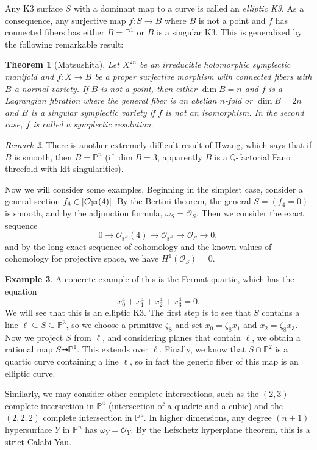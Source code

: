 \documentclass[leqno, openany]{memoir}
\newtheorem{thm}{Theorem}[section]
\theoremstyle{definition}
\newtheorem{exm}[thm]{Example}
\theoremstyle{remark}
\newtheorem{rmk}[thm]{Remark}
\theoremstyle{plain}
\theoremstyle{definition}
\theoremstyle{remark}
\newcommand{\Q}{\mathbb{Q}}
\renewcommand{\P}{\mathbb{P}}
\newcommand{\mc}[1]{\mathcal{#1}}
\begin{document}
Any K3 surface $S$ with a dominant map to a curve is called an \textit{elliptic K3}. As a consequence, any surjective map $f \colon S \to B$ where $B$ is not a point and $f$ has connected fibers has either $B = \P^1$ or $B$ is a singular K3. This is generalized by the following remarkable result:

\begin{thm}[Matsushita]
    Let $X^{2n}$ be an irreducible holomorphic symplectic manifold and $f \colon X \to B$ be a proper surjective morphism with connected fibers with $B$ a normal variety. If $B$ is not a point, then either $\dim B = n$ and $f$ is a Lagrangian fibration where the general fiber is an abelian $n$-fold or $\dim B = 2n$ and $B$ is a singular symplectic variety if $f$ is not an isomorphism. In the second case, $f$ is called a symplectic resolution.
\end{thm}

\begin{rmk}
    There is another extremely difficult result of Hwang, which says that if $B$ is smooth, then $B = \P^n$ (if $\dim B = 3$, apparently $B$ is a $\Q$-factorial Fano threefold with klt singularities).
\end{rmk}

Now we will consider some examples. Beginning in the simplest case, consider a general section $f_4 \in \abs{\mc{O}_{\P^3}(4)}$. By the Bertini theorem, the general $S = (f_4 = 0)$ is smooth, and by the adjunction formula, $\omega_S = \mc{O}_S$. Then we consider the exact sequence
\[ 0 \to \mc{O}_{\P^3}(4) \to \mc{O}_{\P^3} \to \mc{O}_S \to 0, \]
and by the long exact sequence of cohomology and the known values of cohomology for projective space, we have $H^1(\mc{O}_S) = 0$. 

\begin{exm}
    A concrete example of this is the Fermat quartic, which has the equation
    \[ x_0^4 + x_1^4 + x_2^4 + x_3^4 = 0. \]
    We will see that this is an elliptic K3. The first step is to see that $S$ contains a line $\ell \subseteq S \subseteq \P^3$, so we choose a primitive $\zeta_8$ and set $x_0 = \zeta_8 x_1$ and $x_2 = \zeta_8 x_3$. Now we project $S$ from $\ell$, and considering planes that contain $\ell$, we obtain a rational map $S \dashrightarrow \P^1$. This extends over $\ell$. Finally, we know that $S \cap \P^2$ is a quartic curve containing a line $\ell$, so in fact the generic fiber of this map is an elliptic curve.
\end{exm}

Similarly, we may consider other complete intersections, such as the $(2,3)$ complete intersection in $\P^4$ (intersection of a quadric and a cubic) and the $(2,2,2)$ complete intersection in $\P^5$. In higher dimensions, any degree $(n+1)$ hypersurface $Y$ in $\P^n$ has $\omega_Y = \mc{O}_Y$. By the Lefschetz hyperplane theorem, this is a strict Calabi-Yau. 
\end{document}
